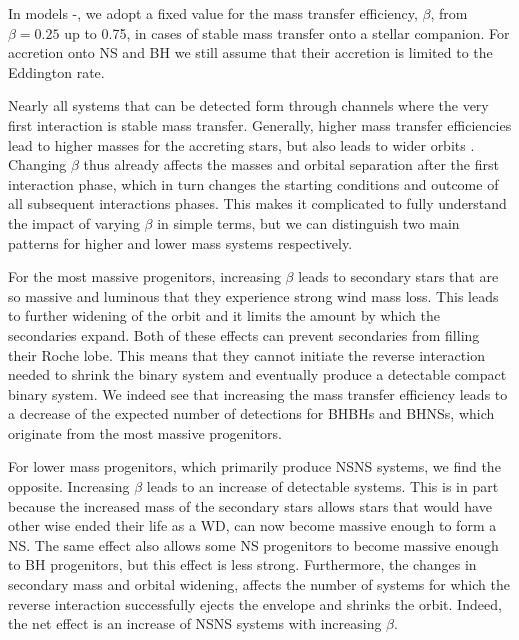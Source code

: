 In models \modBetaLow{}-\modBetaHigh{}, we adopt a fixed value for the mass transfer efficiency, $\beta$, from $\beta=0.25$ up to 0.75, in cases of stable mass transfer onto a stellar companion. For accretion onto NS and BH we still assume that their accretion is limited to the Eddington rate. 


Nearly all systems that can be detected form through channels where the very first interaction is stable mass transfer. Generally, higher mass transfer efficiencies lead to higher masses for the accreting stars, but also leads to wider orbits \citep{Soberman+1997, vanSon+2020}. 
Changing $\beta$ thus already affects the masses and orbital separation after the first interaction phase, which in turn changes the starting conditions and outcome of all subsequent interactions phases. This makes it complicated to fully understand the impact of varying $\beta$ in simple terms, but we can distinguish two main patterns for higher and lower mass systems respectively.   

For the most massive progenitors, increasing $\beta$ leads to secondary stars that are so massive and luminous that they experience strong wind mass loss. This leads to further widening of the orbit and it limits the amount by which the secondaries expand. Both of these effects can prevent secondaries from filling their Roche lobe. This means that they cannot initiate the reverse interaction needed to shrink the binary system and eventually produce a detectable compact binary system. We indeed see that increasing the mass transfer efficiency leads to 
a decrease of the expected number of detections for BHBHs and BHNSs, which originate from the most massive progenitors.  

For lower mass progenitors, which primarily produce NSNS systems, we find the opposite. Increasing $\beta$ leads to an increase of detectable systems. This is in part because the increased mass of the secondary stars allows stars that would have other wise ended their life as a WD, can now become massive enough to form a NS. The same effect also allows some NS progenitors to become massive enough to BH progenitors, but this effect is less strong. Furthermore, the changes in secondary mass and orbital widening, affects the number of systems for which the reverse interaction successfully ejects the envelope and shrinks the orbit. Indeed, the net effect is an increase of NSNS systems with increasing $\beta$.


